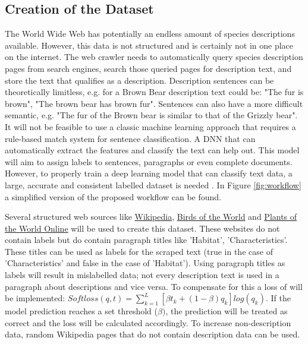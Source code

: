 \documentclass[a4paper, 12pt, oneside]{book} %
\begin{document}
\subsection{Creation of the Dataset}
The World Wide Web has potentially an endless amount of species descriptions available.
However, this data is not structured and is certainly not in one place on the internet.
The web crawler needs to automatically query species description pages from search engines, search those queried pages for description text, and store the text that qualifies as a description.
Description sentences can be theoretically limitless, e.g. for a Brown Bear description text could be: "The fur is brown", "The brown bear has brown fur".
Sentences can also have a more difficult semantic, e.g. "The fur of the Brown bear is similar to that of the Grizzly bear".
It will not be feasible to use a classic machine learning approach that requires a rule-based match system for sentence classification. 
A DNN that can automatically extract the features and classify the text can help out.
This model will aim to assign labels to sentences, paragraphs or even complete documents. 
However, to properly train a deep learning model that can classify text data, a large, accurate and consistent labelled dataset is needed \autocite{munappy_data_2019}.
In Figure \ref{fig:workflow} a simplified version of the proposed workflow can be found.

Several structured web sources like \href{http://www.Wikipedia.com}{Wikipedia}, \href{https://birdsoftheworld.org}{Birds of the World} and \href{http://powo.science.kew.org/}{Plants of the World Online} will be used to create this dataset.
These websites do not contain labels but do contain paragraph titles like 'Habitat', 'Characteristics'. 
These titles can be used as labels for the scraped text (true in the case of 'Characteristics' and false in the case of 'Habitat').
Using paragraph titles as labels will result in mislabelled data; not every description text is used in a paragraph about descriptions and vice versa.
To compensate for this a loss of \textcite{reed_training_2015} will be implemented: \( Softloss(q, t) =  \sum_{k=1}^{L} [\beta t _k + (1- \beta )q _k]log(q _k) \).
If the model prediction reaches a set threshold (\(\beta)\), the prediction will be treated as correct and the loss will be calculated accordingly.
To increase non-description data, random Wikipedia pages that do not contain description data can be used.
\end{document}
